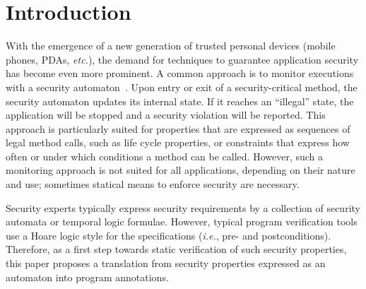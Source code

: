\section{Introduction}\label{SecIntro}

With the emergence of a new generation of trusted personal devices
(mobile phones, PDAs, \emph{etc.}), the demand for
techniques to guarantee application security has become even more
prominent. A common approach is to monitor executions with a security
automaton~\cite{Schneider99}. Upon entry or exit of a
security-critical method, the security automaton updates its internal
state. If it reaches an ``illegal'' state, the application will be
stopped and a security violation will be reported. This approach is
particularly suited for properties that are expressed as sequences of
legal method calls, such as life cycle properties, or constraints that
express how often or under which conditions a method can be called.
%
However, such a monitoring approach is not suited for all
applications, depending on their nature and use; sometimes statical
means to enforce security are necessary.


Security experts typically express security requirements by a collection of
security automata or temporal logic formulae. However, typical program
verification tools use a Hoare logic style for the specifications
(\emph{i.e.}, pre- and postconditions).
Therefore, as a first step towards static
verification of such security properties, this paper proposes a
translation from security properties expressed as an automaton
into program annotations.

